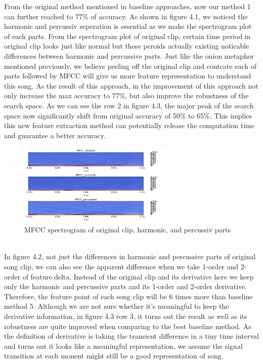 \documentclass[final]{siamltexmm}
\begin{document}
From the original method mentioned in baseline approaches, now our method 1 can further reached to 77\% of accuracy. As shown in figure 4.1, we noticed the harmonic and percussiv seperation is essential as we make the spectrogram plot of each parts. From the spectrogram plot of original clip, certain time period in original clip looks just like normal but these peroids actually existing noticable differences between harmonic and percussive parts. Just like the onion metaphor mentioned previously, we believe peeling off the original clip and contcate each of parts followed by MFCC will give us more feature representation to understand this song. As the result of this approach, in the improvement of this approach not only increase the max accuracy to 77\%, but also improve the robustness of the search space. As we can see the row 2 in figure 4.3, the major peak of the search space now significantly shift from original accuracy of 50\% to 65\%. This implies this new feature extraction method can potentially release the computation time and guarantee a better accuracy.

\begin{figure}[!ht]
  \centering
    \includegraphics[width=0.7\textwidth]{../fig/harmonic_percussiv_mfcc_nolog.png}
  \caption{MFCC spectrogram of original clip, harmonic, and percussiv parts}
\end{figure}

\\In figure 4.2, not just the differences in harmonic and percussive parts of original song clip, we can also see the apparent difference when we take 1-order and 2-order of feature.delta. Instead of the original clip and its derivative here we keep only the harmonic and percussive parts and its 1-order and 2-order derivative. Therefore, the feature point of each song clip will be 6 times more than baseline method 5. Although we are not sure whether it's meaningful to keep the derivative information, in figure 4.3 row 3, it turns out the result as well as its robustness are quite improved when comparing to the best baseline method. As the definition of derivative is taking the transient difference in a tiny time interval and turns out it looks like a meaningful representation, we assume the signal transition at each monent might still be a good representation of song.
\end{document}
